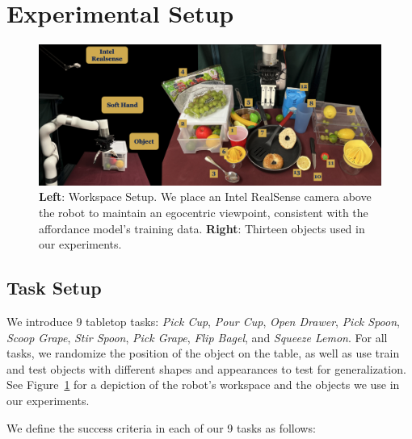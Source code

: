 \section{Experimental Setup}
\label{sec:setup}

\begin{figure}[H]
\centering
\includegraphics[width=\linewidth]{figs/workspace.pdf}
\vspace{-0.2in}
  \caption{\small \textbf{Left}: Workspace Setup. We place an Intel RealSense camera above the robot to maintain an egocentric viewpoint, consistent with the affordance model's training data. \textbf{Right}: Thirteen objects used in our experiments.}
 \label{fig:workspace}
 \vspace{-0.15in}
\end{figure}

\subsection{Task Setup} We introduce 9 tabletop tasks: \textit{Pick Cup}, \textit{Pour Cup}, \textit{Open Drawer}, \textit{Pick Spoon}, \textit{Scoop Grape}, \textit{Stir Spoon}, \textit{Pick Grape}, \textit{Flip Bagel}, and \textit{Squeeze Lemon}. For all tasks, we randomize the position of the object on the table, as well as use train and test objects with different shapes and appearances to test for generalization. See Figure~\ref{fig:workspace} for a depiction of the robot's workspace and the objects we use in our experiments.

We define the success criteria in each of our 9 tasks as follows:

